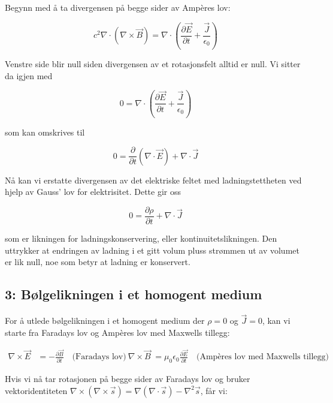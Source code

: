 Begynn med å ta divergensen på begge sider av Ampères lov:

\begin{equation*}
c^2 \nabla \cdot (\nabla \times \vec{B}) = \nabla \cdot \left(\frac{\partial \vec{E}}{\partial t} + \frac{\vec{J}}{\epsilon_0}\right)
\end{equation*}

Venstre side blir null siden divergensen av et rotasjonsfelt alltid er null. Vi sitter da igjen med

\begin{equation*}
0 = \nabla \cdot \left(\frac{\partial \vec{E}}{\partial t} + \frac{\vec{J}}{\epsilon_0}\right)
\end{equation*}

som kan omskrives til

\begin{equation*}
0 = \frac{\partial}{\partial t} (\nabla \cdot \vec{E}) + \nabla \cdot \vec{J}
\end{equation*}

Nå kan vi erstatte divergensen av det elektriske feltet med ladningstettheten ved hjelp av Gauss' lov for elektrisitet. Dette gir oss

\begin{equation*}
0 = \frac{\partial \rho}{\partial t} + \nabla \cdot \vec{J}
\end{equation*}

som er likningen for ladningskonservering, eller kontinuitetslikningen. Den uttrykker at endringen av ladning i et gitt volum pluss strømmen ut av volumet er lik null, noe som betyr at ladning er konservert.

\subsection*{3: Bølgelikningen i et homogent medium}
For å utlede bølgelikningen i et homogent medium der $\rho=0$ og $\vec{J}=0$, kan vi starte fra Faradays lov og Ampères lov med Maxwells tillegg:

\begin{equation*}
\begin{aligned}
\nabla \times \vec{E} &= -\frac{\partial \vec{B}}{\partial t} \quad \text{(Faradays lov)}\
\nabla \times \vec{B} &= \mu_0 \epsilon_0\frac{\partial \vec{E}}{\partial t} \quad \text{(Ampères lov med Maxwells tillegg)}
\end{aligned}
\end{equation*}

Hvis vi nå tar rotasjonen på begge sider av Faradays lov og bruker vektoridentiteten $\nabla \times (\nabla \times \vec{s}) = \nabla (\nabla \cdot \vec{s}) - \nabla^2 \vec{s}$, får vi:

